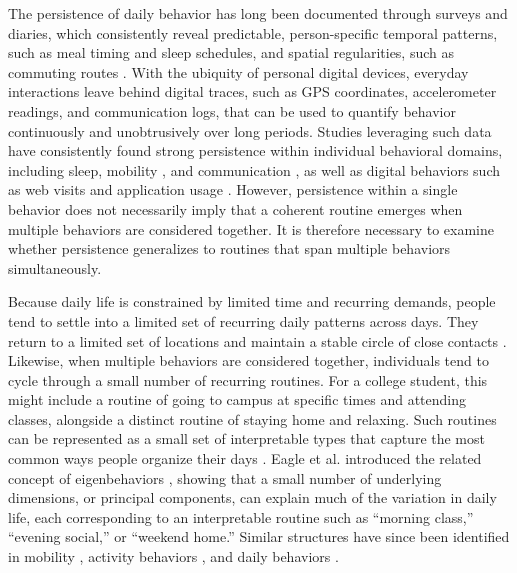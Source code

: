 \documentclass[pdflatex,sn-vancouver,Numbered]{bst/sn-jnl}%
\theoremstyle{thmstyleone}%
\theoremstyle{thmstyletwo}%
\theoremstyle{thmstylethree}%
\begin{document}
The persistence of daily behavior has long been documented through surveys and diaries, which consistently reveal predictable, person-specific temporal patterns, such as meal timing and sleep schedules, and spatial regularities, such as commuting routes \cite{hansonSystematicVariabilityRepetitious1988a, monk1990social, soehnerCircadianPreferenceSleepWake2011, vagni2018patterns}. With the ubiquity of personal digital devices, everyday interactions leave behind digital traces, such as GPS coordinates, accelerometer readings, and communication logs, that can be used to quantify behavior continuously and unobtrusively over long periods. Studies leveraging such data have consistently found strong persistence within individual behavioral domains, including sleep, mobility \cite{songLimitsPredictabilityHuman2010, song2010modelling, alessandretti2020scales}, and communication \cite{saramaki2014persistence, aledavoodDailyRhythmsMobile2015a, aledavood2016channel, heydari2018multichannel, loriteLongTermEvolutionEmail2016, urena2026multiplexity}, as well as digital behaviors such as web visits \cite{barbosa2016returners, hu2018life, kulshrestha2021web} and application usage \cite{malmi2016you, kosinski2013private, petersSocialMediaUse2024, shawBehavioralConsistencyDigital2022}. However, persistence within a single behavior does not necessarily imply that a coherent routine emerges when multiple behaviors are considered together. It is therefore necessary to examine whether persistence generalizes to routines that span multiple behaviors simultaneously.

Because daily life is constrained by limited time and recurring demands, people tend to settle into a limited set of recurring daily patterns across days. They return to a limited set of locations \cite{alessandrettiUnderstandingInterplaySocial2018} and maintain a stable circle of close contacts \cite{saramaki2014persistence}. Likewise, when multiple behaviors are considered together, individuals tend to cycle through a small number of recurring routines. For a college student, this might include a routine of going to campus at specific times and attending classes, alongside a distinct routine of staying home and relaxing. Such routines can be represented as a small set of interpretable types that capture the most common ways people organize their days \cite{farrahiDiscoveringRoutinesLargescale2011, vagni2018patterns}. Eagle et al. introduced the related concept of eigenbehaviors \cite{eagleEigenbehaviorsIdentifyingStructure2009a}, showing that a small number of underlying dimensions, or principal components, can explain much of the variation in daily life, each corresponding to an interpretable routine such as ``morning class,'' ``evening social,'' or ``weekend home.'' Similar structures have since been identified in mobility \cite{jiangClusteringDailyPatterns2012, farrahiDiscoveringRoutinesLargescale2011}, activity behaviors \cite{yangIdentifyingLatentActivity2023a}, and daily behaviors \cite{aledavood2022quantifying, girardiniAdaptationStudentBehavioural2023a, farrahiWhatDidYou2008}.
\end{document}
